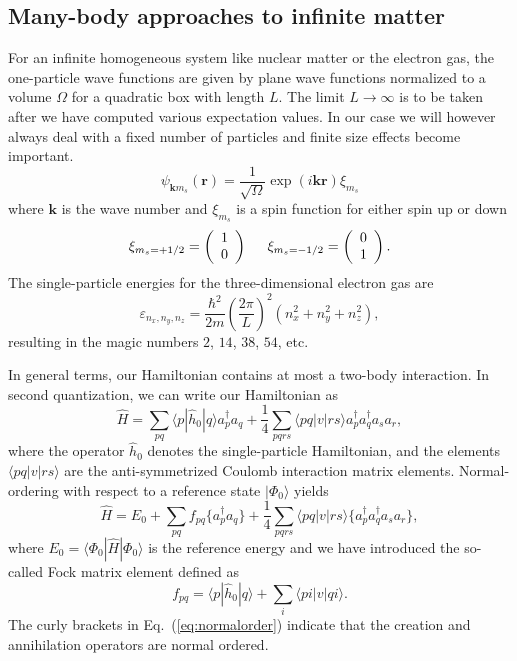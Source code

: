 \documentclass[%
oneside,                 %
final,                   %
10pt]{article}
\begin{document}
\subsection{Many-body approaches to infinite matter}

For an infinite homogeneous system  like nuclear matter or the electron gas, 
the one-particle wave functions are given by plane wave functions
normalized to a volume $\Omega$ for a quadratic box with length
$L$. The limit $L\rightarrow \infty$ is to be taken after we
  have computed various expectation values. In our case we will
  however always deal with a fixed number of particles and finite size
  effects become important. 
\[
\psi_{\mathbf{k}m_s}(\mathbf{r})= \frac{1}{\sqrt{\Omega}}\exp{(i\mathbf{kr})}\xi_{m_s}
\]
where $\mathbf{k}$ is the wave number and $\xi_{m_s}$ is a spin function
for either spin up or down
\[ 
\xi_{m_{s}=+1/2}=\left(\begin{array}{c} 1
  \\ 0 \end{array}\right) \hspace{0.5cm}
\xi_{m_{s}=-1/2}=\left(\begin{array}{c} 0 \\ 1 \end{array}\right).\]
The single-particle energies for the three-dimensional electron gas
are
\[    
\varepsilon_{n_{x}, n_{y}, n_{z}} = \frac{\hbar^{2}}{2m}\left( \frac{2\pi }{L}\right)^{2}(n_{x}^{2}+n_{y}^{2}+n_{z}^{2}),
\]
resulting in the magic numbers $2$, $14$, $38$, $54$, etc.  

In general terms, our Hamiltonian contains at most a two-body
interaction. In second quantization, we can write our Hamiltonian as
\begin{equation}
\hat{H}= \sum_{pq}\langle p | \hat{h}_0 | q \rangle a_p^{\dagger} a_q + \frac{1}{4}\sum_{pqrs}\langle pq |v| r s \rangle a_p^{\dagger} a_q^{\dagger} a_s a_r,
\label{eq:ourHamiltonian}
\end{equation} 
where the operator $\hat{h}_0$ denotes the single-particle
Hamiltonian, and the elements $\langle pq|v|rs\rangle$ are the
anti-symmetrized Coulomb interaction matrix elements.  Normal-ordering
with respect to a reference state $|\Phi_0\rangle$ yields
\begin{equation}
\hat{H}=E_0 + \sum_{pq}f_{pq}\lbrace a_p^{\dagger} a_q\rbrace + \frac{1}{4}\sum_{pqrs}\langle pq |v| r s \rangle \lbrace a_p^{\dagger} a_q^{\dagger} a_s a_r \rbrace,
\label{eq:normalorder}
\end{equation}
where $E_0=\langle\Phi_0| \hat{H}| \Phi_0\rangle$ is the reference energy
and we have introduced the so-called  Fock matrix element defined as
\begin{equation}
f_{pq} = \langle p|\hat{h}_0| q \rangle + \sum\limits_{i} \langle pi |v| qi\rangle.
\label{eq:fockelement}
\end{equation}
The curly brackets in Eq.~(\ref{eq:normalorder}) indicate that the
creation and annihilation operators are normal ordered.
\end{document}
